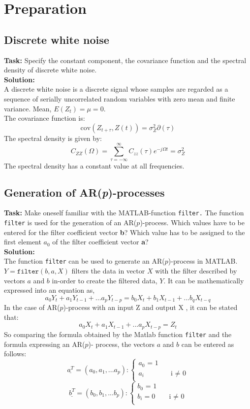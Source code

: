  \chapter{Preparation}

\section{Discrete white noise }
\noindent \textbf{Task:} Specify the constant component, the covariance function and the spectral density of discrete white noise.\\
\noindent \textbf{Solution:}\\
\noindent A discrete white noise is a discrete signal whose samples are regarded as a sequence of serially uncorrelated random variables with zero mean and finite variance. Mean, $E(Z_t) = \mu = 0.$\\
The covariance function is:
$$ \text{cov}(Z_{t+\tau},Z(t)) = \sigma_Z^2 \partial(\tau)$$
The spectral density is given by:
$$C_{ZZ}(\Omega) = \sum_{\tau=-\infty}^{\infty} C_{zz}(\tau)e^{-j\Omega t} = \sigma_Z^2$$
The spectral density has a constant value at all frequencies.

\section{Generation of AR(\textit{p})-processes}
\noindent \textbf{Task:} Make oneself familiar with the MATLAB-function \texttt{filter.} The function \texttt{filter} is used for the generation of an AR($p$)-process. Which values have to be entered for the filter coefficient vector \textbf{b}? Which value has to be assigned to the first element $a_0$ of the filter coefficient vector \textbf{a}?\\
\noindent \textbf{Solution:}\\
\noindent The function \texttt{filter} can be used to generate an AR($p$)-process in MATLAB. $Y = \texttt{filter}(b,a,X)$ filters the data in vector $X$ with the filter described by vectors $a$ and $b$ in-order to create the filtered data, $Y$. It can be mathematically expressed into an equation as,
$$ a_0Y_t+a_1Y_{t-1}+...a_pY_{t-p} = b_0X_t+b_1X_{t-1}+...b_qX_{t-q}$$
\noindent In the case of AR($p$)-process with an input Z and output X , it can be stated that:
$$ a_0X_t+a_1X_{t-1}+...a_pX_{t-p} = Z_t$$
\noindent So comparing the formula obtained by the Matlab function \texttt{filter} and the formula expressing an AR($p$)- process, the vectors $a$ and $b$ can be entered as follows:
\[
\underline{a^T} = (a_0,a_1,...a_p):
\begin{cases}
\text{$a_0$ = 1}\\
\text{$a_i$}  &\quad\text{i $\neq$ 0}\\
\end{cases}
\]
\[
\underline{b^T} = (b_0,b_1,...b_p):
\begin{cases}
\text{$b_0$ = 1}\\
\text{$b_i = 0$}  &\quad\text{i $\neq$ 0}\\
\end{cases}
\]





